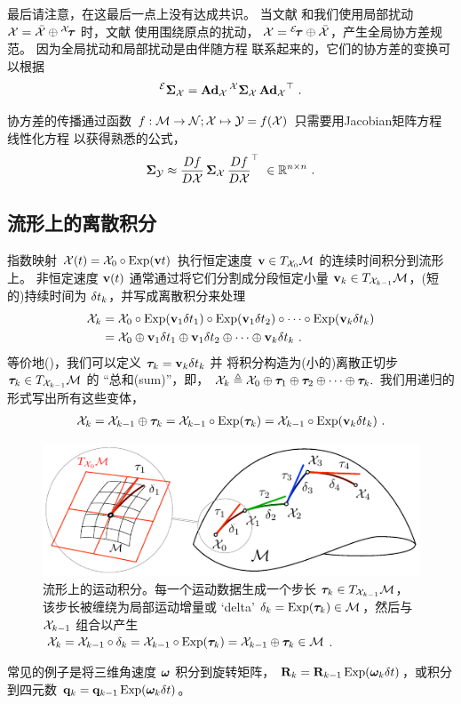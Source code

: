 最后请注意，在这最后一点上没有达成共识。
当文献 \cite{forster2017-TRO} 和我们使用局部扰动 $\cX=\bar\cX\op{^\cX\!\bftau}$ 时，文献 \cite{EADE-Lie,BARFOOT-14} 使用围绕原点的扰动， $\cX={^\cE\!\bftau}\op\bar\cX$，产生全局协方差规范。
因为全局扰动和局部扰动是由伴随方程  联系起来的，它们的协方差的变换可以根据
%
\begin{align}
^\cE\bfSigma_{\cX} = \Ad[\cM]{\cX} \, ^\cX\bfSigma_{\cX} \, \Ad[\cM]{\cX}\tr
~.
\end{align}

协方差的传播通过函数 $f:\cM\to\cN;\cX\mapsto \cY=f(\cX)$ 只需要用Jacobian矩阵方程  线性化方程  以获得熟悉的公式，
%
\begin{align}\label{equ:cov_propagation}
\bfSigma_{\cY} \approx \ndpar{f}{\cX} \, \bfSigma_\cX \, \ndpar{f}{\cX}\tr
~\in\bbR^{n\times n}
~.
\end{align}



\subsection{流形上的离散积分}

指数映射 $\cX(t)=\cX_0\circ\Exp(\bfv t)$ 执行恒定速度 $\bfv\in\mtanat{\cM}{\cX_0}$ 的连续时间积分到流形上。
非恒定速度 $\bfv(t)$ 通常通过将它们分割成分段恒定小量 $\bfv_k\in\mtanat{\cM}{\cX_{k-1}}$，(短的)持续时间为 $\dt_k$，并写成离散积分来处理
%
\begin{align*}
\cX_k &= \cX_0\circ\Exp(\bfv_1 \dt_1)\circ\Exp(\bfv_1 \dt_2)\circ\cdots\circ\Exp(\bfv_k \dt_k) \\
  &= \cX_0 \op \bfv_1 \dt_1\op\bfv_1 \dt_2\op\cdots\op\bfv_k \dt_k
~.
\end{align*}
%
等价地()，我们可以定义 $\bftau_k=\bfv_k\dt_k$ 并
将积分构造为(小的)离散正切步 $\bftau_k\in\mtanat{\cM}{\cX_{k-1}}$ 的 ``总和(sum)''，即，
%
$
\cX_k \te \cX_0\op\bftau_1\op\bftau_2\op\cdots\op\bftau_k.
$
%
我们用递归的形式写出所有这些变体，
%
\begin{align}\label{equ:int_recursive}
\cX_k = \cX_{k-1}\op\bftau_k = \cX_{k-1}\circ\Exp(\bftau_k) = \cX_{k-1}\circ\Exp(\bfv_k\dt_k)
~.
\end{align}
%

\begin{figure}[tb]
\centering
\includegraphics{figures/manifold_int}
\caption{流形上的运动积分。每一个运动数据生成一个步长 $\bftau_k\in\mtanat{\cM}{\cX_{k-1}}$，该步长被缠绕为局部运动增量或 `delta' $\delta_k=\Exp(\bftau_k)\in\cM$，然后与 $\cX_{k-1}$ 组合以产生 $\cX_k=\cX_{k-1}\circ\delta_k=\cX_{k-1}\circ\Exp(\bftau_k)=\cX_{k-1}\op\bftau_k\in\cM$.}
\label{fig:manifold_int}
\end{figure}%

常见的例子是将三维角速度 $\bfomega$ 积分到旋转矩阵， $\bfR_k=\bfR_{k-1}\Exp(\bfomega_k\dt)$，或积分到四元数 $\bfq_k=\bfq_{k-1}\Exp(\bfomega_k\dt)$。


